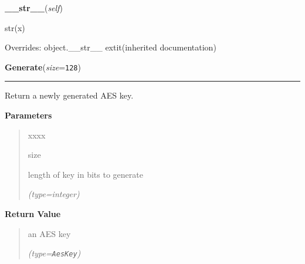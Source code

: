     \vspace{0.5ex}

\hspace{.8\funcindent}\begin{boxedminipage}{\funcwidth}

    \raggedright \textbf{\_\_str\_\_}(\textit{self})

\setlength{\parskip}{2ex}
    str(x)

\setlength{\parskip}{1ex}
      Overrides: object.\_\_str\_\_ 	extit{(inherited documentation)}

    \end{boxedminipage}

    \label{keyczar:keys:AesKey:Generate}

    \vspace{0.5ex}

\hspace{.8\funcindent}\begin{boxedminipage}{\funcwidth}

    \raggedright \textbf{Generate}(\textit{size}={\tt 128})

    \vspace{-1.5ex}

    \rule{\textwidth}{0.5\fboxrule}
\setlength{\parskip}{2ex}
    Return a newly generated AES key.

\setlength{\parskip}{1ex}
      \textbf{Parameters}
      \vspace{-1ex}

      \begin{quote}
        \begin{Ventry}{xxxx}

          \item[size]

          length of key in bits to generate

            {\it (type=integer)}

        \end{Ventry}

      \end{quote}

      \textbf{Return Value}
    \vspace{-1ex}

      \begin{quote}
      an AES key

      {\it (type=\texttt{AesKey})}

      \end{quote}

    \end{boxedminipage}

